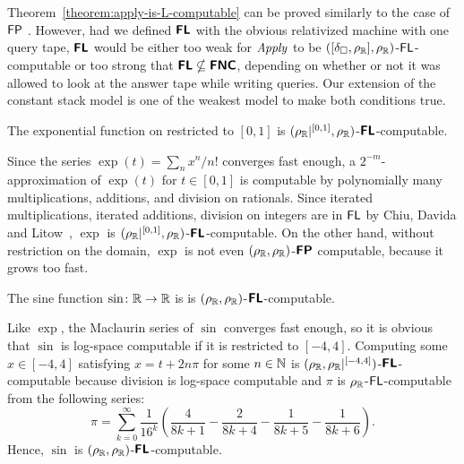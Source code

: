 \documentclass[envcountsame,orivec,oribibl]{llncs}
\begin{document}
Theorem~\ref{theorem:apply-is-L-computable} can be proved 
similarly to the case of $\mathsf{FP}$ 
\cite{kawamura11:_funct_space_repres_and_polyn_time_comput}. 
However, 
had we defined $\text{\bfseries \sffamily \upshape FL}$ with the obvious relativized machine with one query tape,
$\text{\bfseries \sffamily \upshape FL}$ would be either too weak 
for $\mathit{Apply}$ to be $([\delta _\square,\rho _\mathbb R], \rho _\mathbb R)$-$\mathsf{FL}$-computable or
too strong that $\text{\bfseries \sffamily \upshape FL} \nsubseteq \text{\bfseries \sffamily \upshape FNC}$,
depending on whether or not it was allowed to look at the answer tape while writing queries.
Our extension of the constant stack model is one of the weakest model
to make both conditions true.


\begin{lemma}
 The exponential function on restricted to $[0,1]$
 is $(\rho _\mathbb R|^{[0,1]}, \rho _\mathbb R)$-$\text{\bfseries \sffamily \upshape FL}$-computable.
\end{lemma}
Since the series $\exp(t) = \sum_n x^n / n!$ converges fast enough,
a $2^{-m}$-approximation of $\exp(t)$ for $t \in [0,1]$ is computable 
by polynomially many multiplications, additions, and division on rationals.
Since iterated multiplications, iterated additions, division on integers
are in $\mathsf{FL}$ by Chiu, Davida and Litow~\cite{chiu2001division},
$\exp$ is $(\rho _\mathbb R|^{[0,1]}, \rho _\mathbb R)$-$\text{\bfseries \sffamily \upshape FL}$-computable.
On the other hand, without restriction on the domain, $\exp$ is not 
even $(\rho _\mathbb R, \rho _\mathbb R)$-$\text{\bfseries \sffamily \upshape FP}$ computable, 
because it grows too fast. 

\begin{lemma}
  The sine function $\sin \colon \mathbb R \to \mathbb R$ is
 is $(\rho _\mathbb R, \rho _\mathbb R)$-$\text{\bfseries \sffamily \upshape FL}$-computable.
\end{lemma}
Like $\exp$, the Maclaurin series of $\sin$ converges fast enough,
so it is obvious that $\sin$ is log-space computable if it is restricted to $[-4, 4]$.
Computing some $x \in [-4, 4]$ satisfying $x = t + 2n\pi$ for 
some $n \in \mathbb N$ is
$(\rho _\mathbb R, \rho _\mathbb R|^{[-4,4]})$-$\text{\bfseries \sffamily \upshape FL}$-computable because division is log-space computable and $\pi$ is $\rho _\mathbb R$-$\mathsf{FL}$-computable from the following series:
\begin{equation}
 \pi = \sum_{k=0}^\infty \frac{1}{16^k} 
  \left( \frac{4}{8k+1} - \frac{2}{8k+4} - \frac{1}{8k+5} - \frac{1}{8k+6} \right).
\end{equation}
Hence, $\sin$ is $(\rho _\mathbb R, \rho _\mathbb R)$-$\text{\bfseries \sffamily \upshape FL}$-computable.
\end{document}
